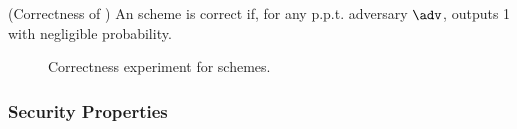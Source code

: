 \begin{definition}{(Correctness of \UAS)}
  \label{def:correctness-uas}
  An \UAS scheme is correct if, for any p.p.t. adversary $\adv$, \ExpCorrect
   outputs 1 with negligible probability.
\end{definition}

\begin{figure}[htp!]
  
  \caption{Correctness experiment for \UAS schemes.}
  \label{fig:exp-uas-corr}
\end{figure}

\subsubsection{Security Properties}
\label{sssec:security}

